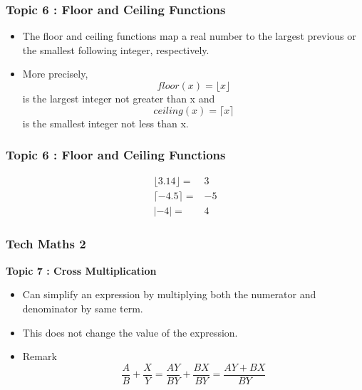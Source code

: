 \documentclass{beamer}
\begin{document}
\begin{frame}
	\frametitle{Topic 6 : Floor and Ceiling Functions}
	\Large
	\begin{itemize}
	\item The floor and ceiling functions map a real number to the largest previous or the smallest following integer, respectively.\smallskip \item More precisely, \[floor(x) = \lfloor x\rfloor \] is the largest integer not greater than x and \[ceiling(x) =  \lceil x \rceil \] is the smallest integer not less than x.
	\end{itemize}
	
	
\end{frame}
\begin{frame}
	\frametitle{Topic 6 : Floor and Ceiling Functions}
	\vspace{-1cm}
	{
		\LARGE
		\begin{eqnarray}
		\lfloor 3.14 \rfloor =& 3 \\
		\lceil -4.5 \rceil =& -5 \\
		| -4 | =&  4
		\end{eqnarray}
	}
\end{frame}



\begin{frame}
	\frametitle{Tech Maths 2}
	\textbf{Topic 7 : Cross Multiplication}
	\Large 
	\begin{itemize}
		\item Can simplify an expression by multiplying both the numerator and denominator by same term.\smallskip
		\item This does not change the value of the expression.\smallskip
		\item Remark
		{
			\LARGE
		\[ \frac{A}{B} + \frac{X}{Y} = \frac{AY}{BY} + \frac{BX}{BY} = \frac{AY+BX}{BY}\]
	}
	\end{itemize}
\end{frame}
\end{document}
